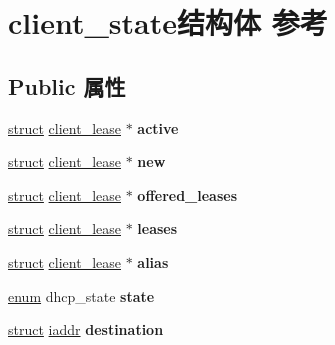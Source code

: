 \hypertarget{structclient__state}{}\section{client\+\_\+state结构体 参考}
\label{structclient__state}
\subsection*{Public 属性}
\begin{DoxyCompactItemize}
\item 
\mbox{\label{structclient__state_a1f99f9cbf3b136807f5825769d505208}} 
\hyperlink{interfacestruct}{struct} \hyperlink{structclient__lease}{client\+\_\+lease} $\ast$ {\bfseries active}
\item 
\mbox{\label{structclient__state_af211dbd88ae518d1dc76f8ac6ff467c9}} 
\hyperlink{interfacestruct}{struct} \hyperlink{structclient__lease}{client\+\_\+lease} $\ast$ {\bfseries new}
\item 
\mbox{\label{structclient__state_ae1df2c9f78b0fcfd79099327bbd76f4f}} 
\hyperlink{interfacestruct}{struct} \hyperlink{structclient__lease}{client\+\_\+lease} $\ast$ {\bfseries offered\+\_\+leases}
\item 
\mbox{\label{structclient__state_a572b66cc14e62738ef9b753cb771501f}} 
\hyperlink{interfacestruct}{struct} \hyperlink{structclient__lease}{client\+\_\+lease} $\ast$ {\bfseries leases}
\item 
\mbox{\label{structclient__state_a04a8fd404e368efbae9ae4a9376a28d5}} 
\hyperlink{interfacestruct}{struct} \hyperlink{structclient__lease}{client\+\_\+lease} $\ast$ {\bfseries alias}
\item 
\mbox{\label{structclient__state_a5ac95dae00fec9c2bf14cf7f16bf7a30}} 
\hyperlink{interfaceenum}{enum} dhcp\+\_\+state {\bfseries state}
\item 
\mbox{\label{structclient__state_aa105904f9c17bf3c2f606ce460809903}} 
\hyperlink{interfacestruct}{struct} \hyperlink{structiaddr}{iaddr} {\bfseries destination}
\item 

\end{DoxyCompactItemize}

